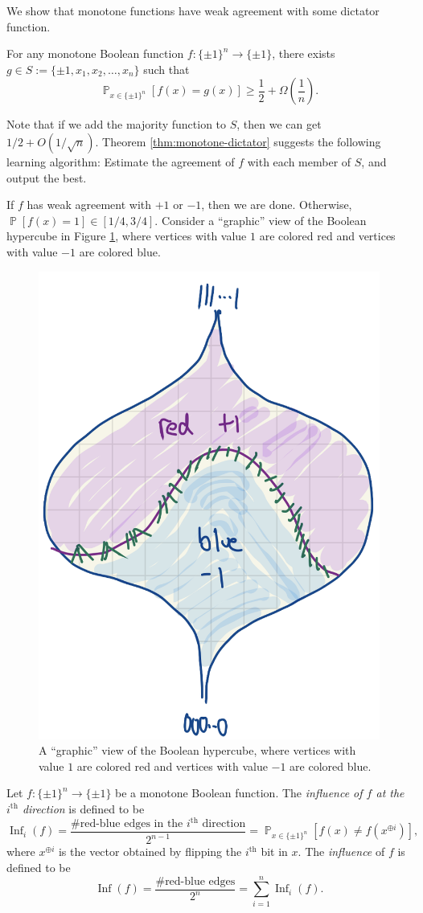 \documentclass[letterpaper, reqno,11pt]{article}
\newcommand{\PP}{\mathop{{}\mathbb{P}}}
\DeclareMathOperator{\Inf}{Inf}
\begin{document}
We show that monotone functions have weak agreement with some dictator function.

\begin{theorem} \label{thm:monotone-dictator}
  For any monotone Boolean function $f : \{ \pm 1 \}^n \to \{ \pm 1 \}$, there exists $g \in S := \{ \pm 1, x_1, x_2, \ldots, x_n \}$ such that
  $$ \PP_{x \in \{ \pm 1 \}^n}[f(x) = g(x)] \geq \frac{1}{2} + \Omega\left(\frac{1}{n}\right). $$
\end{theorem}

Note that if we add the majority function to $S$, then we can get $1/2 + O(1/\sqrt{n})$. Theorem \ref{thm:monotone-dictator} suggests the following learning algorithm: Estimate the agreement of $f$ with each member of $S$, and output the best.

If $f$ has weak agreement with $+1$ or $-1$, then we are done. Otherwise, $\PP[f(x) = 1] \in [1/4, 3/4]$. Consider a ``graphic'' view of the Boolean hypercube in Figure \ref{fig:monotone-hypercube}, where vertices with value $1$ are colored red and vertices with value $-1$ are colored blue.

\begin{figure}[h]
  \centering
  \includegraphics[width=.4\textwidth]{figures/hypercube.png}
  \caption{A ``graphic'' view of the Boolean hypercube, where vertices with value $1$ are colored red and vertices with value $-1$ are colored blue.}
  \label{fig:monotone-hypercube}
\end{figure}

\begin{definition}
  Let $f : \{ \pm 1 \}^n \to \{ \pm 1 \}$ be a monotone Boolean function. The \emph{influence of $f$ at the $i^\text{th}$ direction} is defined to be
  $$ \Inf_i(f) = \frac{\text{\# red-blue edges in the $i^\text{th}$ direction}}{2^{n - 1}} = \PP_{x \in \{ \pm 1 \}^n}\left[f(x) \neq f\left(x^{\oplus i}\right)\right], $$
  where $x^{\oplus i}$ is the vector obtained by flipping the $i^\text{th}$ bit in $x$. The \emph{influence} of $f$ is defined to be
  $$ \Inf(f) = \frac{\text{\# red-blue edges}}{2^n} = \sum_{i = 1}^n \Inf_i(f). $$
\end{definition}
\end{document}

